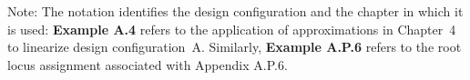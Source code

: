 Note: The notation identifies the design configuration and the chapter
in which it is used: {\bf Example A.4} refers to the application of
approximations in Chapter~4 to linearize design
configuration~A\@. Similarly, {\bf Example A.P.6} refers to the root locus assignment 
associated with Appendix A.P.6.

